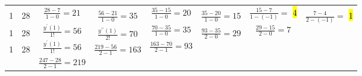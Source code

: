 \documentclass[12pt]{article}
\begin{document}
{\begin{tabular}{|c|c|c|c|c|c|c|c|}
                            &                         & \multirow{2}{*}{$\frac{28-7}{1-0}=21$}        &                                                      & \multirow{2}{*}{$\frac{35-15}{1-0}=20$}        &                                                & \multirow{2}{*}{$\frac{15-7}{1-(-1)}=$ \hl{4}} &                                               \\\cline{0-1}\cline{4-4}\cline{6-6}\cline{8-8}
        \multirow{2}{*}{1}  & \multirow{2}{*}{28}     &                                               & \multirow{2}{*}{$\frac{56-21}{1-0}= 35$}             &                                                & \multirow{2}{*}{$\frac{35-20}{1-0}=15$}        &                                                & \multirow{2}{*}{$\frac{7-4}{2-(-1)}=$ \hl{1}} \\\cline{3-3}\cline{5-5}\cline{7-7}
                            &                         & \multirow{2}{*}{$\frac{y^\prime(1)}{1!}=56$}  &                                                      & \multirow{2}{*}{$\frac{70-35}{1-0}=35$}        &                                                & \multirow{2}{*}{$\frac{29-15}{2-0}=7$}         &                                               \\\cline{0-1}\cline{4-4}\cline{6-6}\cline{8-8}
        \multirow{2}{*}{1}  & \multirow{2}{*}{28}     &                                               & \multirow{2}{*}{$\frac{y^{\prime\prime}(1)}{2!}=70$} &                                                & \multirow{2}{*}{$\frac{93-35}{2-0}=29$}        &                                                &                                               \\\cline{3-3}\cline{5-5}\cline{7-7}
                            &                         & \multirow{2}{*}{$\frac{y^\prime(1)}{1!}=56$}  &                                                      & \multirow{2}{*}{$\frac{163-70}{2-1}=93$}       &                                                & \multicolumn{1}{c}{}                           &                                               \\\cline{0-1}\cline{4-4}\cline{6-6}
        \multirow{2}{*}{1}  & \multirow{2}{*}{28}     &                                               & \multirow{2}{*}{$\frac{219-56}{2-1}=163$}            &                                                & \multicolumn{1}{c}{}                           & \multicolumn{1}{c}{}                           &                                               \\\cline{3-3}\cline{5-5}
                            &                         & \multirow{2}{*}{$\frac{247-28}{2-1}=219$}     &                                                      & \multicolumn{1}{c}{}                           & \multicolumn{1}{c}{}                           & \multicolumn{1}{c}{}                           &                                               \\\cline{0-1}\cline{4-4}

\end{tabular}}
\end{document}
